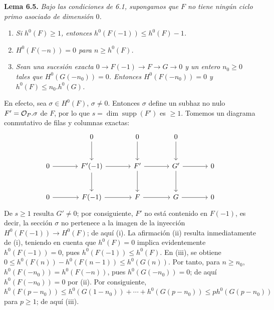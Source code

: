 \textbf{Lema 6.5.} \emph{Bajo las condiciones de 6.1, supongamos que $F$ no
tiene ningún ciclo primo asociado de dimensión $0$.}
\begin{enumerate}[label=(\roman*)]
\item \emph{Si $h^0(F)\geq1$, entonces $h^0(F(-1))\leq h^0(F)-1$.}
\item \emph{$H^0(F(-n))=0$ para $n\geq h^0(F)$.}
\item \emph{Sean una sucesión exacta
$0\to F(-1)\to F\to G\to0$ y un entero $n_0\geq0$ tales que
$H^0(G(-n_0))=0$. Entonces $H^0(F(-n_0))=0$ y
$h^0(F)\leq n_0.h^0(G)$.}
\end{enumerate}
En efecto, sea $\sigma\in H^0(F)$, $\sigma\ne0$. Entonces $\sigma$ define
un subhaz no nulo $F'=\sisi{\mathcal O_X}{\mathcal O_P}.\sigma$ de
$F$, por lo que $s=\dim\operatorname{supp}(F')$ es $\geq1$. Tomemos un diagrama
conmutativo de filas y columnas exactas:
\[
\begin{tikzcd}[column sep=large,row sep=large]
&0 \arrow[d]&0 \arrow[d]&0 \arrow[d]&\\
0 \arrow[r]&F'(-1) \arrow[r] \arrow[d]&F' \arrow[r] \arrow[d]&G'
\arrow[r] \arrow[d]&0\\
0 \arrow[r]&F(-1) \arrow[r]&F \arrow[r]&G \arrow[r]&0
\end{tikzcd}
\]
De $s\geq1$ resulta $G'\ne0$; por consiguiente, $F'$ no está contenido en
$F(-1)$, es decir, la sección $\sigma$ no pertenece a la imagen de la
inyección $H^0(F(-1))\to H^0(F)$; de aquí (i). La afirmación (ii) resulta
inmediatamente de (i), teniendo en cuenta que $h^0(F)=0$ implica
evidentemente $h^0(F(-1))=0$, pues $h^0(F(-1))\leq h^0(F)$. En (iii), se
obtiene
$0\leq h^0(F(n))-h^0(F(n-1))\leq h^0(G(n))$. Por tanto, para
$n\geq n_0$, $h^0(F(-n_0))=h^0(F(-n))$, pues $h^0(G(-n_0))=0$; de aquí
$h^0(F(-n_0))=0$ por (ii). Por consiguiente,
$h^0(F(p-n_0))\leq h^0(G(1-n_0))+\cdots+h^0(G(p-n_0))
\leq ph^0(G(p-n_0))$ para $p\geq1$; de aquí (iii).

